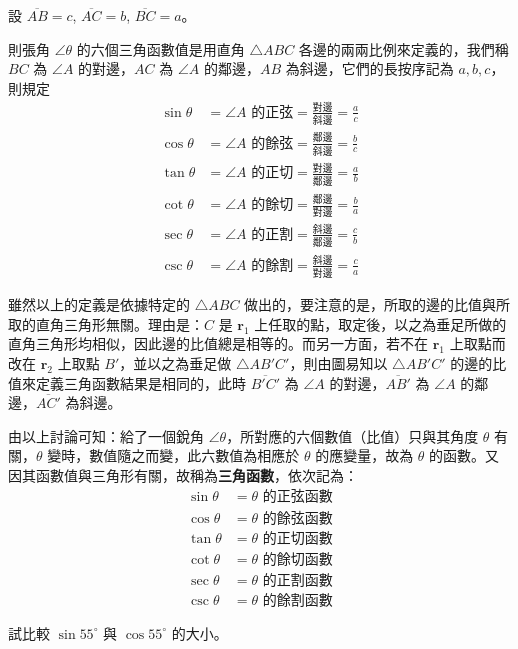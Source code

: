設 $\overline{AB} = c$, $\overline{AC} = b$, $\overline{BC} = a$。

則張角 $\angle\theta$ 的六個三角函數值是用直角 $\triangle ABC$ 各邊的兩兩比例來定義的，我們稱 $BC$ 為 $\angle A$ 的對邊，$AC$ 為 $\angle A$ 的鄰邊，$AB$ 為斜邊，它們的長按序記為 $a, b, c$，則規定
\begin{align*}
\sin\theta &= \angle A\text{ 的正弦} = \frac{\text{對邊}}{\text{斜邊}} = \frac{a}{c} \\
\cos\theta &= \angle A\text{ 的餘弦} = \frac{\text{鄰邊}}{\text{斜邊}} = \frac{b}{c} \\
\tan\theta &= \angle A\text{ 的正切} = \frac{\text{對邊}}{\text{鄰邊}} = \frac{a}{b} \\
\cot\theta &= \angle A\text{ 的餘切} = \frac{\text{鄰邊}}{\text{對邊}} = \frac{b}{a} \\
\sec\theta &= \angle A\text{ 的正割} = \frac{\text{斜邊}}{\text{鄰邊}} = \frac{c}{b} \\
\csc\theta &= \angle A\text{ 的餘割} = \frac{\text{斜邊}}{\text{對邊}} = \frac{c}{a}
\end{align*}

雖然以上的定義是依據特定的 $\triangle ABC$ 做出的，要注意的是，所取的邊的比值與所取的直角三角形無關。理由是：$C$ 是 $\mathbf{r}_1$ 上任取的點，取定後，以之為垂足所做的直角三角形均相似，因此邊的比值總是相等的。而另一方面，若不在 $\mathbf{r}_1$ 上取點而改在 $\mathbf{r}_2$ 上取點 $B'$，並以之為垂足做 $\triangle AB'C'$，則由圖易知以 $\triangle AB'C'$ 的邊的比值來定義三角函數結果是相同的，此時 $\overline{B'C'}$ 為 $\angle A$ 的對邊，$\overline{AB'}$ 為 $\angle A$ 的鄰邊，$\overline{AC'}$ 為斜邊。

由以上討論可知：給了一個銳角 $\angle\theta$，所對應的六個數值（比值）只與其角度 $\theta$ 有關，$\theta$ 變時，數值隨之而變，此六數值為相應於 $\theta$ 的應變量，故為 $\theta$ 的函數。又因其函數值與三角形有關，故稱為\textbf{三角函數}，依次記為：
\begin{align*}
\sin\theta &= \theta\text{ 的正弦函數} \\
\cos\theta &= \theta\text{ 的餘弦函數} \\
\tan\theta &= \theta\text{ 的正切函數} \\
\cot\theta &= \theta\text{ 的餘切函數} \\
\sec\theta &= \theta\text{ 的正割函數} \\
\csc\theta &= \theta\text{ 的餘割函數}
\end{align*}

\begin{example}
試比較 $\sin 55^\circ$ 與 $\cos 55^\circ$ 的大小。
\end{example}

